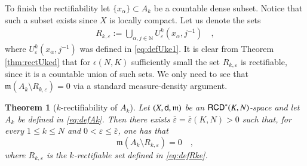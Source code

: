 \documentclass[11pt,reqno]{amsart}
\newcommand{\mm}{\mathfrak m}
\newcommand{\sfd}{{\sf d}}
\newcommand{\N}{\mathbb{N}}
\newcommand{\RCD}{{\sf RCD}}
\newcommand{\vare}{\varepsilon}
\newtheorem{theorem}{Theorem}[section]
\theoremstyle{definition}
\theoremstyle{remark}
\theoremstyle{remark}
\theoremstyle{remark}
\theoremstyle{remark}
\theoremstyle{remark}
\theoremstyle{remark}
\theoremstyle{remark}
\begin{document}
To finish the rectifiability let $\{x_\alpha\} \subset A_k$ be a countable dense subset. Notice that such  a subset exists since $X$ is locally compact.  Let us denote the sets
\begin{align}\label{eq:defRke}
R_{k,\vare}:=\bigcup_{\alpha,j\in \N} U^k_\vare(x_\alpha,j^{-1})\quad,
\end{align}
where   $U^k_\vare(x_\alpha,j^{-1})$ was defined in \eqref{eq:defUke1}. 
It is clear from Theorem \ref{thm:rectUked} that for $\epsilon(N,K)$ sufficiently small the set $R_{k,\vare}$ is rectifiable, since it is a countable union of such sets.  We only need to  see that $\mm(A_k\setminus R_{k,\vare})=0$ via a standard measure-density argument.  

\begin{theorem}[$k$-rectifiability of $A_k$]\label{thm:Akrect}
Let $(X,\sfd,\mm)$ be an $\RCD^*(K,N)$-space and let $A_k$ be defined in \eqref{eq:defAk}. Then there exists $\bar{\vare}=\bar{\vare}(K,N)>0$ such that, for every $1\leq k \leq N$ and $0<\vare\leq \bar{\vare}$, one has that 
$$\mm(A_k\setminus R_{k,\vare})=0 \quad,$$
where $R_{k,\vare}$ is the $k$-rectifiable set  defined in   \eqref{eq:defRke}.
\end{theorem}
\end{document}
